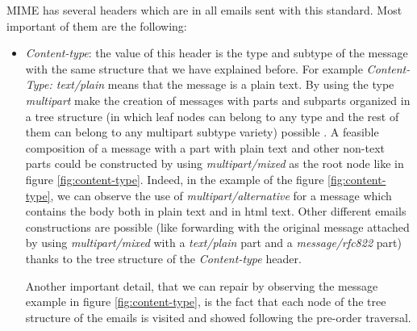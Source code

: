 MIME has several headers which are in all emails sent with this standard. Most important of them are the following:

\begin{itemize}
	\item\textit{Content-type}: the value of this header is the type and subtype of the message with the same structure that we have explained before. For example \textit{Content-Type: text/plain} means that the message is a plain text. By using the type \textit{multipart} make the creation of messages with parts and subparts organized in a tree structure (in which leaf nodes can belong to any type and the rest of them can belong to any multipart subtype variety) possible \citep[section 7.2]{rfc1341}. A feasible composition of a message with a part with plain text and other non-text parts could be constructed by using \textit{multipart/mixed} as the root node like in figure \ref{fig:content-type}. Indeed, in the example of the figure \ref{fig:content-type}, we can observe the use of \textit{multipart/alternative} for a message which contains the body both in plain text and in html text. Other different emails constructions are possible (like forwarding with the original message attached by using \textit{multipart/mixed} with a \textit{text/plain} part and a \textit{message/rfc822} part) thanks to the tree structure of the \textit{Content-type} header.
	
	Another important detail, that we can repair by observing the message example in figure \ref{fig:content-type}, is the fact that each node of the tree structure of the emails is visited and showed following the pre-order traversal.
	

\end{itemize}

